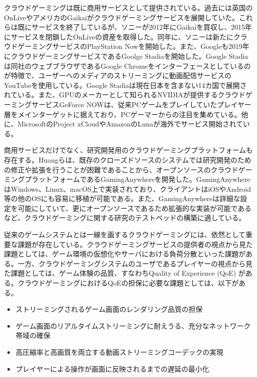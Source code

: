 クラウドゲーミングは既に商用サービスとして提供されている。過去には英国のOnLive\cite{onlive}やアメリカのGaikaiがクラウドゲーミングサービスを展開していた。これらは既にサービスを終了しているが、ソニーが2012年にGaikaiを買収し、2015年にサービスを閉鎖したOnLiveの資産を取得した\cite{onlive-sony-gaikai}。同年に、ソニーは新たにクラウドゲーミングサービスのPlayStation Now\cite{ps-now}を開始した。また、Googleも2019年にクラウドゲーミングサービスであるGoolge Stadia\cite{stadia}を開始した。Google Stadiaは同社のウェブブラウザであるGoogle Chromeをインターフェースとしているのが特徴で、ユーザーへのメディアのストリーミングに動画配信サービスのYouTubeを使用している。Google Stadiaは現在日本を含まない14カ国で展開されている。また、GPUのメーカーとして知られるNVIDIAが提供するクラウドゲーミングサービスGeForce NOW\cite{geforce-now}は、従来PCゲームをプレイしていたプレイヤー層をメインターゲットに据えており、PCゲーマーからの注目を集めている。他に、MicrosoftのProject xCloudやAmazonのLunaが海外でサービス開始されている。

商用サービスだけでなく、研究開発用のクラウドゲーミングプラットフォームも存在する。Huangら\cite{gaminganywhere}は、既存のクローズドソースのシステムでは研究開発のための修正や拡張を行うことが困難であることから、オープンソースのクラウドゲーミングプラットフォームであるGamingAnywhereを開発した。GamingAnywhereはWindows、Linux、macOS上で実装されており、クライアントはiOSやAndroid等の他のOSにも容易に移植が可能である。また、GamingAnywhereは詳細な設定を可能にしていて、更にオープンソースであるため拡張的な実装が可能であるなど、クラウドゲーミングに関する研究のテストベッドの構築に適している。

従来のゲームシステムとは一線を画するクラウドゲーミングには、依然として重要な課題が存在している\cite{cloudgaming-survey}。クラウドゲーミングサービスの提供者の視点から見た課題としては、ゲーム環境の仮想化やサーバにおける負荷分散といった課題がある。一方、クラウドゲーミングシステムのユーザであるプレイヤーの視点から見た課題としては、ゲーム体験の品質、すなわちQuality of Experience (QoE) がある。クラウドゲーミングにおけるQoEの担保に必要な課題としては、以下がある。
\begin{itemize}
    \item ストリーミングされるゲーム画面のレンダリング品質の担保
    \item ゲーム画面のリアルタイムストリーミングに耐えうる、充分なネットワーク帯域の確保
    \item 高圧縮率と高画質を両立する動画ストリーミングコーデックの実現
    \item プレイヤーによる操作が画面に反映されるまでの遅延の最小化
\end{itemize}

